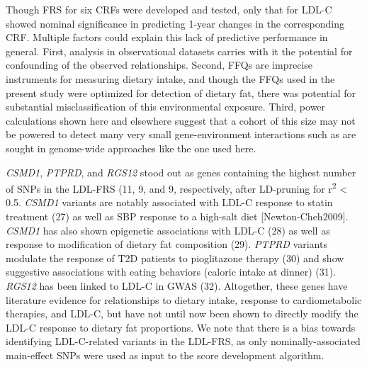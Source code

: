 \documentclass[]{article}
\begin{document}
Though FRS for six CRFs were developed and tested, only that for LDL-C
showed nominal significance in predicting 1-year changes in the
corresponding CRF. Multiple factors could explain this lack of
predictive performance in general. First, analysis in observational
datasets carries with it the potential for confounding of the observed
relationships. Second, FFQs are imprecise instruments for measuring
dietary intake, and though the FFQs used in the present study were
optimized for detection of dietary fat, there was potential for
substantial misclassification of this environmental exposure. Third,
power calculations shown here and elsewhere suggest that a cohort of
this size may not be powered to detect many very small gene-environment
interactions such as are sought in genome-wide approaches like the one
used here.

\emph{CSMD1}, \emph{PTPRD}, and \emph{RGS12} stood out as genes
containing the highest number of SNPs in the LDL-FRS (11, 9, and 9,
respectively, after LD-pruning for r\textsuperscript{2} \textless{} 0.5.
\emph{CSMD1} variants are notably associated with LDL-C response to
statin treatment (27) as well as SBP response to a high-salt diet
{[}Newton-Cheh2009{]}. \emph{CSMD1} has also shown epigenetic
associations with LDL-C (28) as well as response to modification of
dietary fat composition (29). \emph{PTPRD} variants modulate the
response of T2D patients to pioglitazone therapy (30) and show
suggestive associations with eating behaviors (caloric intake at dinner)
(31). \emph{RGS12} has been linked to LDL-C in GWAS (32). Altogether,
these genes have literature evidence for relationships to dietary
intake, response to cardiometabolic therapies, and LDL-C, but have not
until now been shown to directly modify the LDL-C response to dietary
fat proportions. We note that there is a bias towards identifying
LDL-C-related variants in the LDL-FRS, as only nominally-associated
main-effect SNPs were used as input to the score development algorithm.
\end{document}
